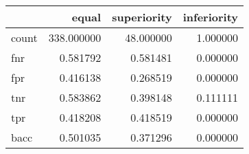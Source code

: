 \begin{tabular}{lrrr}
\toprule
{} &       equal &  superiority &  inferiority \\
\midrule
count &  338.000000 &    48.000000 &     1.000000 \\
fnr   &    0.581792 &     0.581481 &     0.000000 \\
fpr   &    0.416138 &     0.268519 &     0.000000 \\
tnr   &    0.583862 &     0.398148 &     0.111111 \\
tpr   &    0.418208 &     0.418519 &     0.000000 \\
bacc  &    0.501035 &     0.371296 &     0.000000 \\
\bottomrule
\end{tabular}
